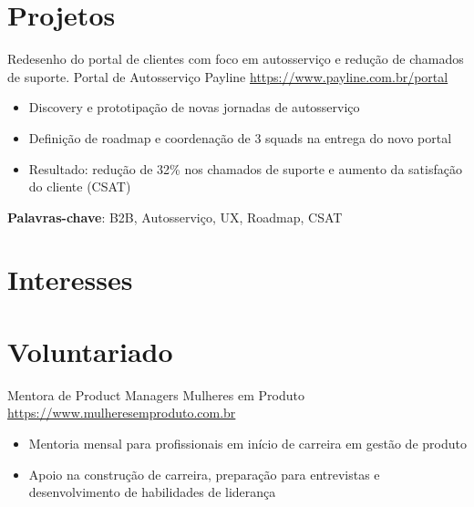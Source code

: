 \documentclass[a4paper, serif, 10pt]{moderncv}
\begin{document}
\section{Projetos}

        {Redesenho do portal de clientes com foco em autosserviço e redução de chamados de suporte.}
        {Portal de Autosserviço Payline}
        {\url{https://www.payline.com.br/portal}}
        {}
        {\begin{itemize}
\item Discovery e prototipação de novas jornadas de autosserviço
\item Definição de roadmap e coordenação de 3 squads na entrega do novo portal
\item Resultado: redução de 32\% nos chamados de suporte e aumento da satisfação do cliente (CSAT)
\end{itemize}
\textbf{Palavras-chave}: B2B, Autosserviço, UX, Roadmap, CSAT}
\section{Interesses}

\section{Voluntariado}

        {Mentora de Product Managers}
        {Mulheres em Produto}
        {\url{https://www.mulheresemproduto.com.br}}
        {}
        {\begin{itemize}
\item Mentoria mensal para profissionais em início de carreira em gestão de produto
\item Apoio na construção de carreira, preparação para entrevistas e desenvolvimento de habilidades de liderança
\end{itemize}}
    
\end{document}

